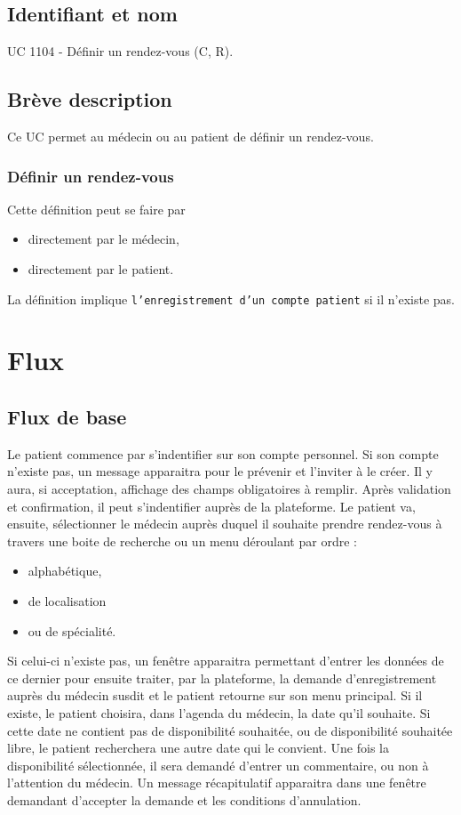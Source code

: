 \subsection{Identifiant et nom}
UC 1104 - Définir un rendez-vous (C, R).
\subsection{Brève description}
Ce UC permet au médecin ou au patient de définir un rendez-vous.
\subsubsection{Définir un rendez-vous}
Cette définition peut se faire par 
\begin{itemize}
	\item directement par le médecin,
	\item directement par le patient.
\end{itemize}

La définition implique \texttt{l'enregistrement d'un compte patient} si il n'existe pas.
\newpage

\section{Flux}
\subsection{Flux de base}
Le patient commence par s'indentifier sur son compte personnel. 
Si son compte n'existe pas, un message apparaitra pour le prévenir et l'inviter
à le créer. Il y aura, si acceptation, affichage des champs obligatoires à
remplir. Après validation et confirmation, il peut s'indentifier auprès de la plateforme.
Le patient va, ensuite, sélectionner le médecin auprès duquel il souhaite
prendre rendez-vous à travers une boite de recherche ou un menu déroulant par
ordre :
\begin{itemize}
	\item alphabétique,
	\item de localisation
	\item ou de spécialité.
\end{itemize}

Si celui-ci n'existe pas, un fenêtre apparaitra permettant d'entrer les données 
de ce dernier pour ensuite traiter, par la plateforme, la
demande d'enregistrement auprès du médecin susdit et le patient retourne sur
son menu principal.
Si il existe, le patient choisira, dans l'agenda du médecin, la date qu'il
souhaite. Si cette date ne contient pas de disponibilité souhaitée, ou de
disponibilité souhaitée libre, le patient recherchera une autre date qui le 
convient.
Une fois la disponibilité sélectionnée, il sera demandé d'entrer un commentaire,
ou non à l'attention du médecin. Un message récapitulatif apparaitra dans une
fenêtre demandant d'accepter la demande et les conditions d'annulation.

